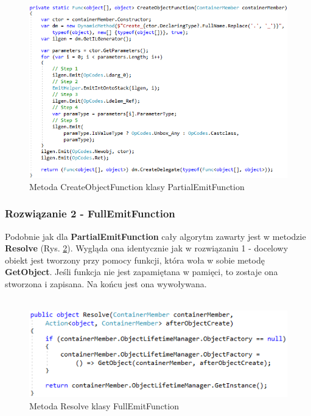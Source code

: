 \documentclass[12pt]{article}
\begin{document}
\begin{figure}[H]
	\begin{center}
  		\includegraphics{PartialEmitFunction_CreateObjectFunction.png}
  		\caption{Metoda CreateObjectFunction klasy PartialEmitFunction}
  		\label{fig:PartialEmitFunction_CreateObjectFunction}
	\end{center}
\end{figure}

\subsubsection{Rozwiązanie 2 - FullEmitFunction}
Podobnie jak dla \textbf{PartialEmitFunction} cały algorytm zawarty jest w metodzie \textbf{Resolve} (Rys. \ref{fig:FullEmitFunction_Resolve}). Wygląda ona identycznie jak w rozwiązaniu 1 - docelowy obiekt jest tworzony przy pomocy funkcji, która woła w sobie metodę \textbf{GetObject}. Jeśli funkcja nie jest zapamiętana w pamięci, to zostaje ona stworzona i zapisana. Na końcu jest ona wywoływana.\\ \\
\begin{figure}[H]
	\begin{center}
  		\includegraphics{FullEmitFunction_Resolve.png}
  		\caption{Metoda Resolve klasy FullEmitFunction}
  		\label{fig:FullEmitFunction_Resolve}
	\end{center}
\end{figure}
\end{document}
